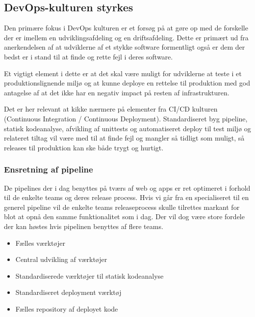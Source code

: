 \documentclass{article}
\begin{document}
\subsection{DevOps-kulturen styrkes}
Den primære fokus i DevOps kulturen er et forsøg på at gøre op med de forskelle der er imellem en udviklingsafdeling og en driftsafdeling. Dette er primært ud fra anerkendelsen af at udviklerne af et stykke software formentligt også er dem der bedst er i stand til at finde og rette fejl i deres software.

Et vigtigt element i dette er at det skal være muligt for udviklerne at teste i et produktionslignende miljø og at kunne deploye en rettelse til produktion med god antagelse af at det ikke har en negativ impact på resten af infrastrukturen. 

Det er her relevant at kikke nærmere på elementer fra CI/CD kulturen (Continuous Integration / Continuous Deployment). Standardiseret byg pipeline, statisk kodeanalyse, afvikling af unittests og automatiseret deploy til test miljø og relateret tiltag vil være med til at finde fejl og mangler så tidligt som muligt, så releases til produktion kan ske både trygt og hurtigt.



\subsubsection{Ensretning af pipeline}
De pipelines der i dag benyttes på tværs af web og apps er ret optimeret i forhold til de enkelte teams og deres release process. Hvis vi går fra en specialiseret til en generel pipeline vil de enkelte teams releaseprocess skulle tilrettes markant for blot at opnå den samme funktionalitet som i dag. Der vil dog være store fordele der kan høstes hvis pipelinen benyttes af flere teams. 
\begin{itemize}
\item Fælles værktøjer
\item Central udvikling af værktøjer
\item Standardiserede værktøjer til statisk kodeanalyse
\item Standardiseret deployment værktøj
\item Fælles repository af deployet kode
\end{itemize}
\end{document}
